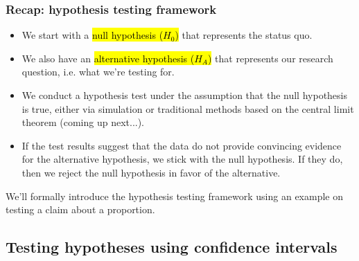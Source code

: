 \documentclass[t,compress,mathserif]{beamer}
\begin{document}

\begin{frame}
\frametitle{Recap: hypothesis testing framework}

\begin{itemize}
\item We start with a \hl{null hypothesis ($H_0$)} that represents the status quo.
\pause
\item We also have an \hl{alternative hypothesis ($H_A$)} that represents our research question, i.e. what we're testing for.
\pause
\item We conduct a hypothesis test under the assumption that the null hypothesis is true, either via simulation or traditional methods based on the central limit theorem (coming up next...).
\pause
\item If the test results suggest that the data do not provide convincing evidence for the alternative hypothesis, we stick with the null hypothesis. If they do, then we reject the null hypothesis in favor of the alternative.
\end{itemize}
\pause
We'll formally introduce the hypothesis testing framework using an example on testing a claim about a proportion.

\end{frame}


 \subsection{Testing hypotheses using confidence intervals} 

\end{document}
